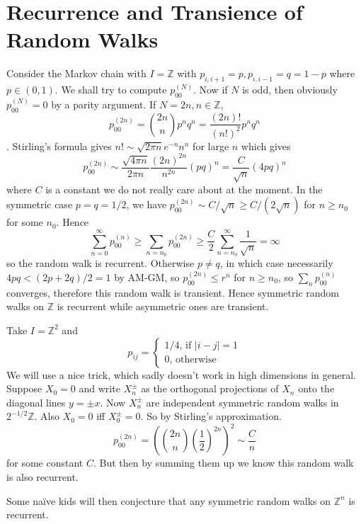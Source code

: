 \section{Recurrence and Transience of Random Walks}
\begin{example}
    Consider the Markov chain with $I=\mathbb Z$ with $p_{i,i+1}=p,p_{i,i-1}=q=1-p$ where $p\in (0,1)$.
    We shall try to compute $p_{00}^{(N)}$.
    Now if $N$ is odd, then obviously $p_{00}^{(N)}=0$ by a parity argument.
    If $N=2n,n\in\mathbb Z$,
    $$p_{00}^{(2n)}=\binom{2n}{n}p^nq^n=\frac{(2n)!}{(n!)^2}p^nq^n$$.
    Stirling's formula gives $n!\sim\sqrt{2\pi n}e^{-n}n^n$ for large $n$ which gives
    $$p_{00}^{(2n)}\sim\frac{\sqrt{4\pi n}}{2\pi n}\frac{(2n)^{2n}}{n^{2n}}(pq)^n=\frac{C}{\sqrt{n}}(4pq)^n$$
    where $C$ is a constant we do not really care about at the moment.
    In the symmetric case $p=q=1/2$, we have $p_{00}^{(2n)}\sim C/\sqrt{n}\ge C/(2\sqrt{n})$ for $n\ge n_0$ for some $n_0$.
    Hence
    $$\sum_{n=0}^\infty p_{00}^{(n)}\ge \sum_{n=n_0}p_{00}^{(2n)}\ge \frac{C}{2}\sum_{n=n_0}^\infty \frac{1}{\sqrt{n}}=\infty$$
    so the random walk is recurrent.
    Otherwise $p\neq q$, in which case necessarily $4pq<(2p+2q)/2=1$ by AM-GM, so $p_{00}^{(2n)}\le r^n$ for $n\ge n_0$, so $\sum_np_{00}^{(n)}$ converges, therefore this random walk is transient.
    Hence symmetric random walks on $\mathbb Z$ is recurrent while asymmetric ones are transient.
\end{example}
\begin{example}
    Take $I=\mathbb Z^2$ and
    $$p_{ij}=\begin{cases}
        1/4\text{, if $|i-j|=1$}\\
        0\text{, otherwise}
    \end{cases}$$
    We will use a nice trick, which sadly doesn't work in high dimensions in general.
    Suppose $X_0=0$ and write $X_n^{\pm}$ as the orthogonal projections of $X_n$ onto the diagonal lines $y=\pm x$.
    Now $X_n^\pm$ are independent symmetric random walks in $2^{-1/2}\mathbb Z$.
    Also $X_0=0$ iff $X_0^{\pm}=0$.
    So by Stirling's approximation.
    $$p_{00}^{(2n)}=\left( \binom{2n}{n}\left(\frac{1}{2}\right)^{2n} \right)^2\sim\frac{C}{n}$$
    for some constant $C$.
    But then by summing them up we know this random walk is also recurrent.
\end{example}
Some na\"ive kids will then conjecture that any symmetric random walks on $\mathbb Z^n$ is recurrent.
